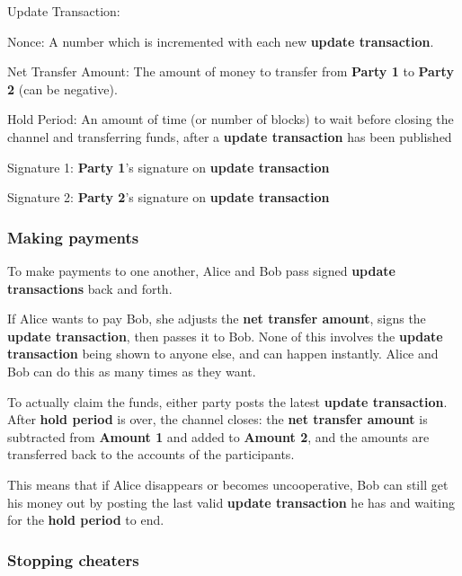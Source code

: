 \documentclass[a4paper]{article}
\newcommand{\bgls}[1]{\textbf{\gls{#1}}}
\newcommand{\bglspl}[1]{\textbf{\glspl{#1}}}
\newenvironment{mydescription}
{\begin{description}
\setlength{\itemsep}{5pt}
  \setlength{\parskip}{0pt}
  \setlength{\labelsep}{5pt}
}{
\end{description}}
\begin{document}
\begin{mdframed}[style=message]
\begin{mydescription}
  \item[Update Transaction:] \hfill
    \begin{mydescription}
      \item[Nonce:] A number which is incremented with each new \bgls{update transaction}.
      \item[Net Transfer Amount:] The amount of money to transfer from \textbf{Party 1} to \textbf{Party 2} (can be negative).
      \item[Hold Period:] An amount of time (or number of blocks) to wait before closing the channel and transferring funds, after a \bgls{update transaction} has been published
    \end{mydescription}
  \item[Signature 1:] \textbf{Party 1}'s signature on \bgls{update transaction}
  \item[Signature 2:] \textbf{Party 2}'s signature on \bgls{update transaction}
\end{mydescription}
\end{mdframed}

\subsubsection{Making payments}

To make payments to one another, Alice and Bob pass signed \bglspl{update transaction} back and forth.

If Alice wants to pay Bob, she adjusts the \bgls{net transfer amount}, signs the \bgls{update transaction}, then passes it to Bob. None of this involves the \bgls{update transaction} being shown to anyone else, and can happen instantly. Alice and Bob can do this as many times as they want.

To actually claim the funds, either party posts the latest \bgls{update transaction}. After \bgls{hold period} is over, the channel closes: the \bgls{net transfer amount} is subtracted from \textbf{Amount 1} and added to \textbf{Amount 2}, and the amounts are transferred back to the accounts of the participants.

This means that if Alice disappears or becomes uncooperative, Bob can still get his money out by posting the last valid \bgls{update transaction} he has and waiting for the \bgls{hold period} to end.

\subsubsection{Stopping cheaters}
\end{document}
